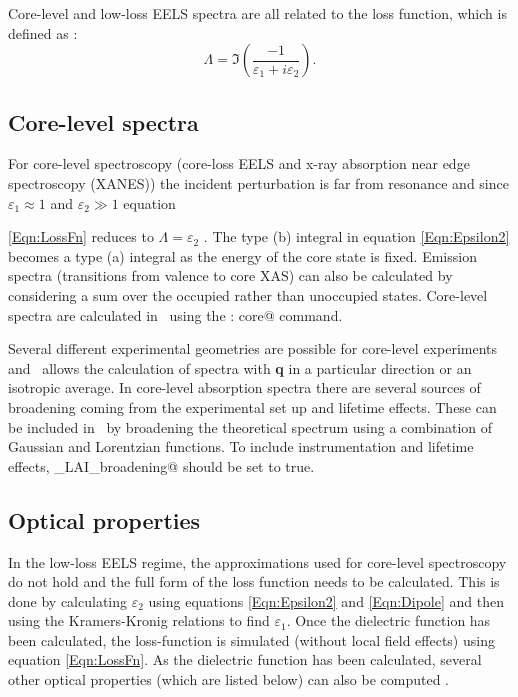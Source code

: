 \documentclass[a4paper,11pt,twoside]{book}
\begin{document}
Core-level and low-loss EELS spectra are all related to the loss function, which is defined as \cite{egerton}:
\begin{equation}
\Lambda = \Im \left ( \frac{-1}{\varepsilon_1 + i\varepsilon_2  } \right ).
\label{Eqn:LossFn}
\end{equation}


\subsection{Core-level spectra}

For core-level spectroscopy (core-loss EELS and x-ray absorption near edge spectroscopy (XANES)) the incident perturbation is far from resonance and since $\varepsilon_1\approx1$ and $\varepsilon_2\gg1$ equation\,{\ref{Eqn:LossFn} reduces to  $\Lambda = \varepsilon_2$ \cite{egerton}.  
The type (b) integral in equation \ref{Eqn:Epsilon2} becomes a type (a) integral as the energy of the core state is fixed.  Emission spectra (transitions from valence to core XAS) can also be calculated by considering a sum over the occupied rather than unoccupied states.  Core-level spectra are calculated in \optados\ using the \verb@task : core@ command.

Several different experimental geometries are possible for core-level experiments and \optados\ allows the calculation of spectra with {\bf q} in a particular direction or an isotropic average.  
In core-level absorption spectra there are several sources of broadening coming from the experimental set up and lifetime effects.  These can be included in \optados\ by broadening the theoretical spectrum using a combination of Gaussian and Lorentzian functions.  To include instrumentation and lifetime effects, \verb@core_LAI_broadening@ should be set to true.  

\subsection{Optical properties}

In the low-loss EELS regime, the approximations used for core-level spectroscopy do not hold and the full form of the loss function needs to be calculated.  This is done by calculating $\varepsilon_2$ using equations \ref{Eqn:Epsilon2} and \ref{Eqn:Dipole} and then using the Kramers-Kronig relations to find $\varepsilon_1$.  Once the dielectric function has been calculated, the loss-function is simulated (without local field effects) using equation \ref{Eqn:LossFn}. As the dielectric function has been calculated, several other optical properties (which are listed below) can also be computed \cite{dressel}. 

}
\end{document}
